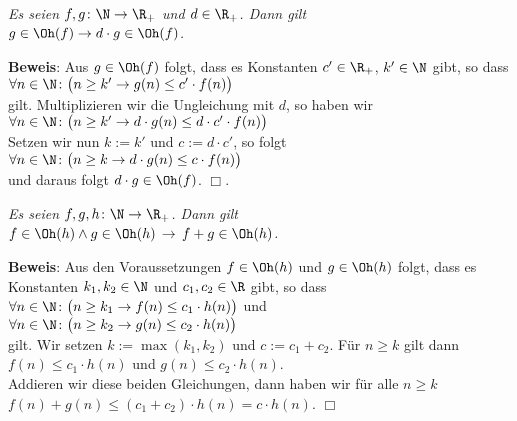 \begin{Proposition} \hspace*{\fill} \\
{\em
  Es seien  $f,g\colon \N \rightarrow {\R_+}$
   und $d \in \R_+$.  Dann gilt \\[0.1cm]
  \hspace*{1.3cm} $g \in \Oh(f) \rightarrow d \cdot g \in \Oh(f)$.
}
\end{Proposition}
\textbf{Beweis}: Aus $g \in \Oh(f)$ folgt, dass es Konstanten $c'\in \R_+$, $k'\in \N$ gibt,
so dass \\[0.1cm]
\hspace*{1.3cm} 
$\forall n \in \N \colon \bigl(n \geq k'  \rightarrow g(n) \leq c' \cdot f(n)\bigr)$ \\[0.1cm]
gilt.  Multiplizieren wir die Ungleichung mit $d$, so haben wir \\[0.1cm]
\hspace*{1.3cm} 
$\forall n \in \N \colon\bigl( n \geq k'  \rightarrow d \cdot g(n) \leq d \cdot c' \cdot f(n)\bigr)$ \\[0.1cm]
Setzen wir nun $k:=k'$ und $c := d \cdot c'$, so folgt \\[0.1cm]
\hspace*{1.3cm} $\forall n \in \N \colon \bigl(n \geq k  \rightarrow d \cdot g(n) \leq c \cdot f(n)\bigr)$ 
\\[0.1cm]
und daraus folgt $d \cdot g \in \Oh(f)$. \hspace*{\fill} $\Box$.

\begin{Proposition}
{\em
  Es seien $f,g,h \colon \N \rightarrow {\R_+}$.  Dann gilt \\[0.1cm]
  \hspace*{1.3cm} $f \in \Oh(h) \wedge g \in \Oh(h) \,\rightarrow\, f + g \in \Oh(h)$.
}
\end{Proposition}
\textbf{Beweis}: Aus den Voraussetzungen $f \in \Oh(h)$ und $g \in \Oh(h)$ folgt, dass es
Konstanten $k_1,k_2\in \N$ und $c_1,c_2\in \R$ gibt, so dass \\[0.1cm]
\hspace*{1.3cm} 
$\forall n \in \N \colon \bigl( n \geq k_1 \rightarrow f(n) \leq c_1 \cdot h(n)\bigr)$ 
\quad und\\[0.1cm]
\hspace*{1.3cm} 
$\forall n \in \N \colon\bigl( n \geq k_2 \rightarrow g(n) \leq c_2 \cdot h(n)\bigr)$
\\[0.1cm]
gilt.  Wir setzen $k := \max(k_1,k_2)$ und $c:= c_1 + c_2$.  F\"ur $n \geq k$ gilt dann \\[0.1cm]
\hspace*{1.3cm} $f(n) \leq c_1 \cdot h(n)$ und $g(n) \leq c_2 \cdot h(n)$. \\[0.1cm]
Addieren wir diese beiden Gleichungen, dann haben wir f\"ur alle $n \geq k$ \\[0.1cm]
\hspace*{1.3cm} $f(n) + g(n) \leq (c_1 + c_2) \cdot h(n) = c \cdot h(n)$. \hspace*{\fill} $\Box$

